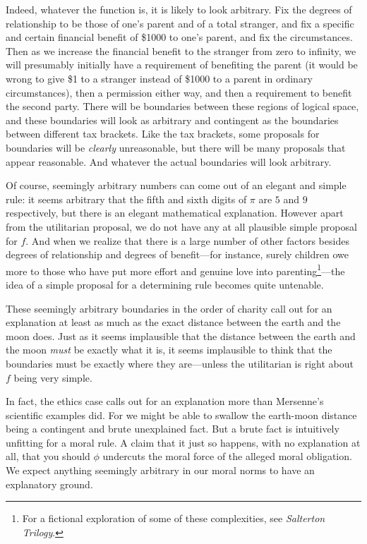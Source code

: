 Indeed, whatever the function is, it is likely to look arbitrary. Fix the degrees of relationship to be those of one's parent and of a total stranger,
and fix a specific and certain financial benefit of \$1000 to one's parent, and fix the circumstances. Then as we increase the 
financial benefit to the stranger from zero to infinity, we will presumably initially have a requirement of benefiting the parent
(it would be wrong to give \$1 to a stranger instead of \$1000 to a parent in ordinary circumstances), 
then a permission either way, and then a requirement to benefit the second party. There will be boundaries between these regions
of logical space, and these boundaries will look as arbitrary and contingent as the boundaries between different tax brackets.
Like the tax brackets, some proposals for boundaries will be \textit{clearly} unreasonable, but there will be many proposals
that appear reasonable. And whatever the actual boundaries will look arbitrary.

Of course, seemingly arbitrary numbers can come out of an elegant and simple rule: it seems arbitrary that the fifth and sixth 
digits of $\pi$ are $5$ and $9$ respectively, but there is an elegant mathematical explanation. However apart from the
utilitarian proposal, we do not have any at all plausible simple proposal for $f$. And when we realize that there is
a large number of other factors besides degrees of relationship and degrees of benefit---for instance, surely children owe
more to those who have put more effort and genuine love into parenting\footnote{For a fictional exploration of some of these
complexities, see  \textit{Salterton Trilogy}.}---the idea of a simple proposal for a determining rule becomes
quite untenable.

These seemingly arbitrary boundaries in the order of charity call out for an explanation at least as much as 
the exact distance between the earth and the moon does. Just as it seems implausible that the distance between the earth
and the moon \textit{must} be exactly what it is, it seems implausible to think that the boundaries must be exactly where
they are---unless the utilitarian is right about $f$ being very simple. 

In fact, the ethics case calls out for an explanation more than Mersenne's scientific examples did. For we might 
be able to swallow the earth-moon distance being a contingent and brute unexplained fact. But a brute fact is 
intuitively unfitting for a moral rule. A claim that it just so happens, with no explanation at all, that you should 
$\phi$ undercuts the moral force of the alleged moral obligation. We expect anything seemingly arbitrary in our moral norms to have an explanatory ground.

